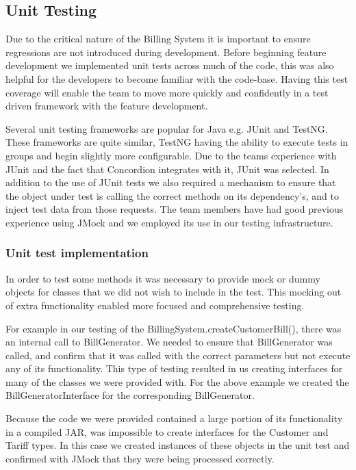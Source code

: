 \documentclass[pdftex,11pt,a4paper]{article}
\begin{document}
\subsection{Unit Testing}

Due to the critical nature of the Billing System it is important to ensure regressions are not introduced during development. Before beginning feature development we implemented unit tests across much of the code, this was also helpful for the developers to become familiar with the code-base. Having this test coverage will enable the team to move more quickly and confidently in a test driven framework with the feature development.

Several unit testing frameworks are popular for Java e.g. JUnit and TestNG. These frameworks are quite similar, TestNG having the ability to execute tests in groups and begin slightly more configurable. Due to the teams experience with JUnit and the fact that Concordion integrates with it, JUnit was selected. In addition to the use of JUnit tests we also required a mechanism to ensure that the object under test is calling the correct methods on its dependency's, and to inject test data from those requests. The team members have had good previous experience using JMock and we employed its use in our testing infrastructure.

\subsubsection{Unit test implementation}
In order to test some methods it was necessary to provide mock or dummy objects for classes that we did not wish to include in the test. This mocking out of extra functionality enabled more focused and comprehensive testing.

For example in our testing of the BillingSystem.createCustomerBill(), there was an internal call to BillGenerator. We needed to ensure that BillGenerator was called, and confirm that it was called with the correct parameters but not execute any of its functionality. This type of testing resulted in us creating interfaces for many of the classes we were provided with. For the above example we created the BillGeneratorInterface for the corresponding BillGenerator.

Because the code we were provided contained a large portion of its functionality in a compiled JAR, was impossible to create interfaces for the Customer and Tariff types. In this case we created instances of these objects in the unit test and confirmed with JMock that they were being processed correctly.
\end{document}
